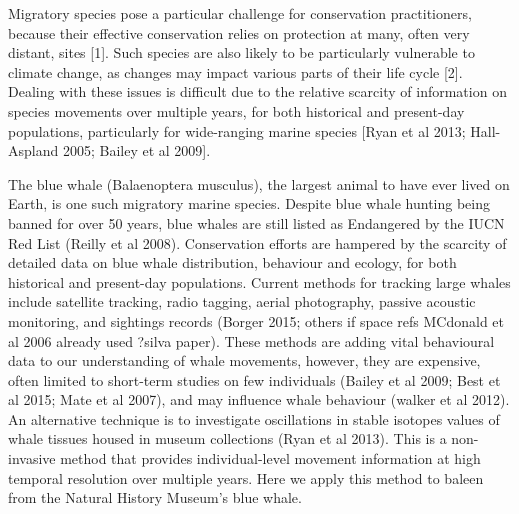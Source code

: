 \documentclass[a4paper,12pt]{article}
\begin{document}
Migratory species pose a particular challenge for conservation practitioners, because their effective conservation relies on protection at many, often very distant, sites [1]. 
Such species are also likely to be particularly vulnerable to climate change, as changes may impact various parts of their life cycle [2]. 
Dealing with these issues is difficult due to the relative scarcity of information on species movements over multiple years, for both historical and present-day populations, particularly for wide-ranging marine species [Ryan et al 2013; Hall-Aspland 2005; Bailey et al 2009]. 
 
The blue whale (Balaenoptera musculus), the largest animal to have ever lived on Earth, is one such migratory marine species. 
Despite blue whale hunting being banned for over 50 years, blue whales are still listed as Endangered by the IUCN Red List (Reilly et al 2008).
Conservation efforts are hampered by the scarcity of detailed data on blue whale distribution, behaviour and ecology, for both historical and present-day populations. 
Current methods for tracking large whales include satellite tracking, radio tagging, aerial photography, passive acoustic monitoring, and sightings records (Borger 2015; others if space refs MCdonald et al 2006 already used ?silva paper). 
These methods are adding vital behavioural data to our understanding of whale movements, however, they are expensive, often limited to short-term studies on few individuals (Bailey et al 2009; Best et al 2015; Mate et al 2007), and may influence whale behaviour (walker et al 2012). 
An alternative technique is to investigate oscillations in stable isotopes values of whale tissues housed in museum collections (Ryan et al 2013).
This is a non-invasive method that provides individual-level movement information at high temporal resolution over multiple years. 
Here we apply this method to baleen from the Natural History Museum's blue whale.
 
\end{document}
